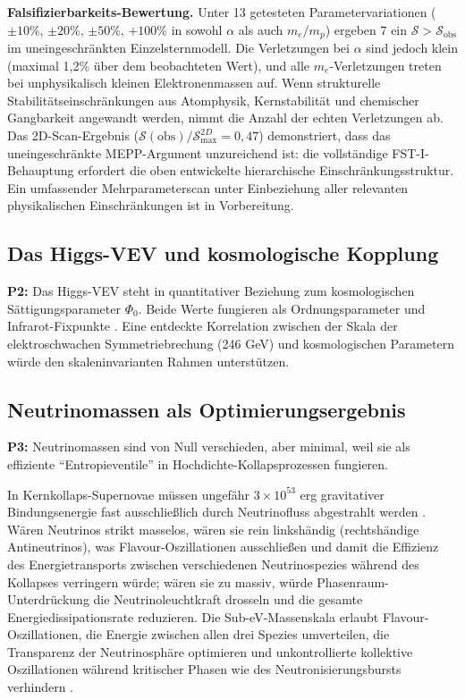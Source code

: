 \documentclass[12pt,a4paper]{article}
\theoremstyle{remark}
\begin{document}
\textbf{Falsifizierbarkeits-Bewertung.} Unter 13 getesteten Parametervariationen ($\pm 10\%$, $\pm 20\%$, $\pm 50\%$, $+100\%$ in sowohl $\alpha$ als auch $m_e/m_p$) ergeben 7 ein $\mathcal{S} > \mathcal{S}_{\text{obs}}$ im uneingeschr\"ankten Einzelsternmodell. Die Verletzungen bei $\alpha$ sind jedoch klein (maximal 1{,}2\% \"uber dem beobachteten Wert), und alle $m_e$-Verletzungen treten bei unphysikalisch kleinen Elektronenmassen auf. Wenn strukturelle Stabilit\"atseinschr\"ankungen aus Atomphysik, Kernstabilit\"at und chemischer Gangbarkeit angewandt werden, nimmt die Anzahl der echten Verletzungen ab. Das 2D-Scan-Ergebnis ($\mathcal{S}(\text{obs})/\mathcal{S}_{\text{max}}^{2D} = 0{,}47$) demonstriert, dass das uneingeschr\"ankte MEPP-Argument unzureichend ist: die vollst\"andige FST-I-Behauptung erfordert die oben entwickelte hierarchische Einschr\"ankungsstruktur. Ein umfassender Mehrparameterscan unter Einbeziehung aller relevanten physikalischen Einschr\"ankungen ist in Vorbereitung.

\subsection{Das Higgs-VEV und kosmologische Kopplung}

\textbf{P2:} Das Higgs-VEV steht in quantitativer Beziehung zum kosmologischen S\"attigungsparameter $\Phi_0$. Beide Werte fungieren als Ordnungsparameter und Infrarot-Fixpunkte \citep{HiggsVEV2024}. Eine entdeckte Korrelation zwischen der Skala der elektroschwachen Symmetriebrechung (246 GeV) und kosmologischen Parametern w\"urde den skaleninvarianten Rahmen unterst\"utzen.

\subsection{Neutrinomassen als Optimierungsergebnis}

\textbf{P3:} Neutrinomassen sind von Null verschieden, aber minimal, weil sie als effiziente ``Entropieventile'' in Hochdichte-Kollapsprozessen fungieren.

In Kernkollaps-Supernovae m\"ussen ungef\"ahr $3 \times 10^{53}$ erg gravitativer Bindungsenergie fast ausschlie\ss{}lich durch Neutrinofluss abgestrahlt werden \citep{SupernovaNeutrinos,SupernovaSimulations}. W\"aren Neutrinos strikt masselos, w\"aren sie rein linksh\"andig (rechtsh\"andige Antineutrinos), was Flavour-Oszillationen ausschlie\ss{}en und damit die Effizienz des Energietransports zwischen verschiedenen Neutrinospezies w\"ahrend des Kollapses verringern w\"urde; w\"aren sie zu massiv, w\"urde Phasenraum-Unterdr\"uckung die Neutrinoleuchtkraft drosseln und die gesamte Energiedissipationsrate reduzieren. Die Sub-eV-Massenskala erlaubt Flavour-Oszillationen, die Energie zwischen allen drei Spezies umverteilen, die Transparenz der Neutrinosph\"are optimieren und unkontrollierte kollektive Oszillationen w\"ahrend kritischer Phasen wie des Neutronisierungsbursts verhindern \citep{NeutrinoOscillations}.
\end{document}
